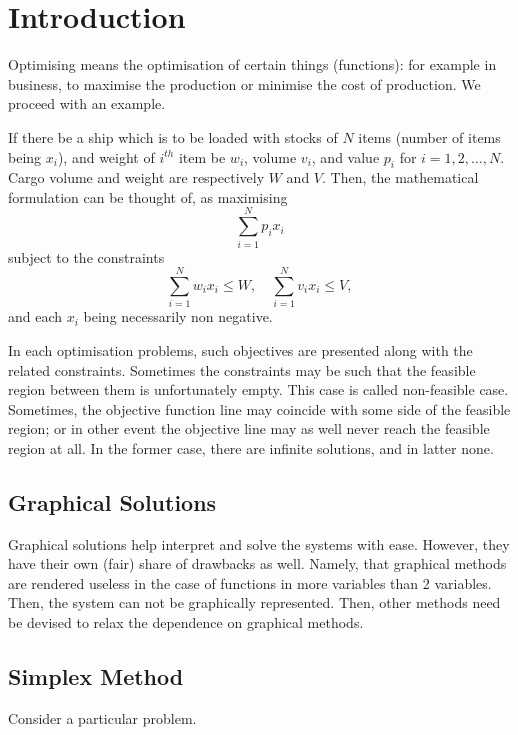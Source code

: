 \chapter{Introduction}
\myskip

Optimising means the optimisation of certain things (functions): for example in business, to maximise the production or minimise the cost of production. We proceed with an example.

\begin{example}
	If there be a ship which is to be loaded with stocks of $N$ items (number of items being $x_i$), and weight of $i^{th}$ item be $w_i$, volume $v_i$, and value $p_i$ for $i = 1, 2, \ldots, N$. Cargo volume and weight are respectively $W$ and $V$. Then, the mathematical formulation can be thought of, as maximising
	$$\sum_{i=1}^N p_ix_i$$
	subject to the constraints
	$$\sum_{i=1}^N w_ix_i \le W, \quad \sum_{i=1}^N v_ix_i \le V,$$
	and each $x_i$ being necessarily non negative.
\end{example}

In each optimisation problems, such objectives are presented along with the related constraints.
Sometimes the constraints may be such that the feasible region between them is unfortunately empty. This case is called non-feasible case. Sometimes, the objective function line may coincide with some side of the feasible region; or in other event the objective line may as well never reach the feasible region at all. In the former case, there are infinite solutions, and in latter none.

\section{Graphical Solutions}

Graphical solutions help interpret and solve the systems with ease. However, they have their own (fair) share of drawbacks as well. Namely, that graphical methods are rendered useless in the case of functions in more variables than 2 variables. Then, the system can not be graphically represented. Then, other methods need be devised to relax the dependence on graphical methods.

\section{Simplex Method}

Consider a particular problem.

